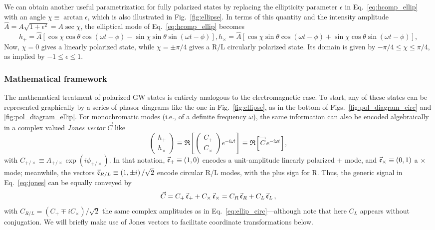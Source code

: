 \documentclass[aps,prd,twocolumn,superscriptaddress,preprintnumbers,floatfix,nofootinbib]{revtex4-2}
\newcommand{\beq}{\begin{equation}}
\newcommand{\eeq}{\end{equation}}
\newcommand*{\eq}[1]{Eq.~\eqref{eq:#1}}
\begin{document}
We can obtain another useful parametrization for fully polarized states by replacing the ellipticity parameter $\epsilon$ in \eq{hcomp_ellip} with an angle $\chi \equiv \arctan \epsilon$, which is also illustrated in Fig.~\ref{fig:ellipse}.
In terms of this quantity and the intensity amplitude $\hat{A}=A\sqrt{1+\epsilon^2}=A \sec\chi$, the elliptical mode of \eq{hcomp_ellip} becomes
\begin{subequations} \label{eq:hcomp_ellip_chi}
\beq
h_+ = \hat{A} \left[\cos\chi \cos \theta \cos(\omega t - \phi) - \sin\chi \sin \theta \sin(\omega t - \phi)\right] ,
\eeq
\beq
h_\times = \hat{A} \left[\cos\chi \sin \theta \cos(\omega t - \phi) + \sin\chi \cos \theta \sin(\omega t - \phi)\right] ,
\eeq
\end{subequations}
Now, $\chi = 0$ gives a linearly polarized state, while $\chi=\pm \pi/4$ gives a R/L circularly polarized state.
Its domain is given by $-\pi/4 \leq \chi \leq \pi/4$, as implied by $-1 \leq \epsilon \leq 1$.

\subsubsection{Mathematical framework}
\label{sec:math}

The mathematical treatment of polarized GW states is entirely analogous to the electromagnetic case.
To start, any of these states can be represented graphically by a series of phasor diagrams like the one in Fig.~\ref{fig:ellipse}, as in the bottom of Figs.~\ref{fig:pol_diagram_circ} and \ref{fig:pol_diagram_ellip}.
For monochromatic modes (i.e., of a definite frequency $\omega$), the same information can also be encoded algebraically in a complex valued \emph{Jones vector} $\vec{C}$ like 
\beq \label{eq:jones}
\begin{pmatrix}
h_+\\
h_\times
\end{pmatrix} \equiv
\Re \left[ \begin{pmatrix}
C_+\\
C_\times
\end{pmatrix} e^{-i\omega t}\right] \equiv
\Re \left[ \vec{C}\, e^{-i\omega t}\right] ,
\eeq
with $C_{+/\times} \equiv A_{+/\times} \exp(i\phi_{+/\times})$.
In that notation, $ \vec{\mathfrak{e}}_+ \equiv \left(1, 0\right)$ encodes a unit-amplitude linearly polarized $+$ mode, and $\vec{\mathfrak{e}}_\times \equiv \left(0,1\right)$ a $\times$ mode; meanwhile, the vectors $\vec{\mathfrak{e}}_{R/L} \equiv \left(1,\pm i\right)/\sqrt{2}$ encode circular R/L modes, with the plus sign for R.
Thus, the generic signal in \eq{jones} can be equally conveyed by
\beq \label{eq:jones_bases}
\vec{C} = C_+ \, \jonesbasis_+ + C_\times \, \jonesbasis_\times = C_R \, \jonesbasis_R + C_L \, \jonesbasis_L\, ,
\eeq
with $C_{R/L} = (C_+ \mp i C_\times)/\sqrt{2}$ the same complex amplitudes as in \eq{ellip_circ}---although note that here $C_L$ appears without conjugation.
We will briefly make use of Jones vectors to facilitate coordinate transformations below.
\end{document}
